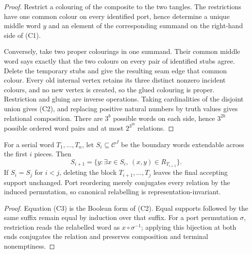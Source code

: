 \begin{proof}
Restrict a colouring of the composite to the two tangles.  The restrictions
have one common colour on every identified port, hence determine a unique
middle word \(y\) and an element of the corresponding summand on the
right-hand side of (C1).

Conversely, take two proper colourings in one summand.  Their common middle
word says exactly that the two colours on every pair of identified stubs
agree.  Delete the temporary stubs and give the resulting seam edge that
common colour.  Every old internal vertex retains its three distinct
nonzero incident colours, and no new vertex is created, so the glued
colouring is proper.  Restriction and gluing are inverse operations.  Taking
cardinalities of the disjoint union gives (C2), and replacing positive
natural numbers by truth values gives relational composition.  There are
\(3^b\) possible words on each side, hence \(3^{2b}\) possible ordered word
pairs and at most \(2^{3^{2b}}\) relations.
\end{proof}

\begin{corollary}
\label{cor:bounded-interface-support-update}
\Sprose
For a serial word \(T_1,\ldots,T_n\), let \(S_i\subseteq\mathcal C^J\)
be the boundary words extendable across the first \(i\) pieces.  Then
\[
 S_{i+1}=\{y:\exists x\in S_i,\ (x,y)\in R_{T_{i+1}}\}.              \tag{C3}
\]
If \(S_i=S_j\) for \(i<j\), deleting the block
\(T_{i+1},\ldots,T_j\) leaves the final accepting support unchanged.
Port reordering merely conjugates every relation by the induced permutation,
so canonical relabelling is representation-invariant.
\end{corollary}

\begin{proof}
Equation (C3) is the Boolean form of (C2).  Equal supports followed by the
same suffix remain equal by induction over that suffix.  For a port
permutation \(\sigma\), restriction reads the relabelled word as
\(x\circ\sigma^{-1}\); applying this bijection at both ends conjugates the
relation and preserves composition and terminal nonemptiness.
\end{proof}

